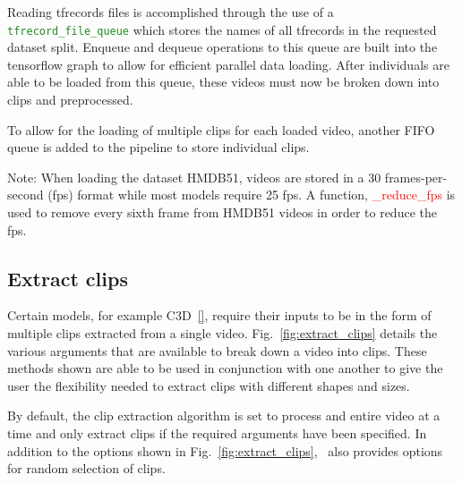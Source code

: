 \documentclass{llncs}
\begin{document}
Reading tfrecords files is accomplished through the use of a \texttt{\textcolor{ForestGreen}{tfrecord\_file\_queue}} which stores the names of all tfrecords in the requested dataset split.
Enqueue and dequeue operations to this queue are built into the tensorflow graph to allow for efficient parallel data loading.
After individuals are able to be loaded from this queue, these videos must now be broken down into clips and preprocessed.

To allow for the loading of multiple clips for each loaded video, another FIFO queue is added to the pipeline to store individual clips.

Note: When loading the dataset HMDB51, videos are stored in a 30 frames-per-second (fps) format while most models require 25 fps. A function, \textcolor{red}{\_reduce\_fps} is used to remove every sixth frame from HMDB51 videos in order to reduce the fps.

\subsection{Extract clips}
\label{sec:extractclips}
Certain models, for example C3D~\ref{}, require their inputs to be in the form of multiple clips extracted from a single video.
Fig.~\ref{fig:extract_clips} details the various arguments that are available to break down a video into clips.
These methods shown are able to be used in conjunction with one another to give the user the flexibility needed to extract clips with different shapes and sizes.
 
By default, the clip extraction algorithm is set to process and entire video at a time and only extract clips if the required arguments have been specified.
In addition to the options shown in Fig.~\ref{fig:extract_clips}, \acro~also provides options for random selection of clips.
\end{document}
